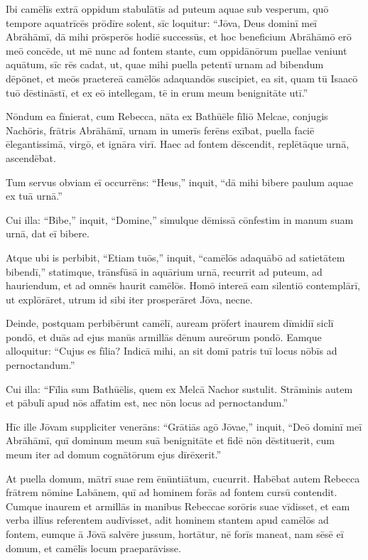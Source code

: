 \Versus Ibi camēlīs extrā oppidum stabulātīs ad puteum aquae sub vesperum, quō tempore aquatrīcēs prōdīre solent,
\Versus sīc loquitur: ``Jōva, Deus dominī meī Abrāhāmī, dā mihi prōsperōs hodiē successūs, et hoc beneficium Abrāhāmō erō meō concēde,
\Versus ut mē nunc ad fontem stante, cum oppidānōrum puellae veniunt aquātum, sīc rēs cadat,
\Versus ut, quae mihi puella petentī urnam ad bibendum dēpōnet, et meōs praetereā camēlōs adaquandōs suscipiet, ea sit, quam tū Isaacō tuō dēstināstī, et ex eō intellegam, tē in erum meum benignitāte utī.''

\Versus Nōndum ea fīnierat, cum Rebecca, nāta ex Bathūēle fīliō Melcae, conjugis Nachōris, frātris Abrāhāmī, urnam in umerīs ferēns exībat,
\Versus puella faciē ēlegantissimā, virgō, et ignāra virī. Haec ad fontem dēscendit, replētāque urnā, ascendēbat.

\Versus Tum servus obviam eī occurrēns: ``Heus,'' inquit, ``dā mihi bibere paulum aquae ex tuā urnā.''

\Versus Cui illa: ``Bibe,'' inquit, ``Domine,'' simulque dēmissā cōnfestim in manum suam urnā, dat eī bibere.

\Versus Atque ubi is perbibit, ``Etiam tuōs,'' inquit, ``camēlōs adaquābō ad satietātem bibendī,''
\Versus statimque, trānsfūsā in aquārium urnā, recurrit ad puteum, ad hauriendum, et ad omnēs haurit camēlōs.
\Versus Homō intereā eam silentiō contemplārī, ut explōrāret, utrum id sibi iter prosperāret Jōva, necne.

\Versus Deinde, postquam perbibērunt camēlī, auream prōfert inaurem dīmidiī siclī pondō, et duās ad ejus manūs armillās dēnum aureōrum pondō.
\Versus Eamque alloquitur: ``Cujus es fīlia? Indicā mihi, an sit domī patris tuī locus nōbīs ad pernoctandum.''

\Versus Cui illa: ``Fīlia sum Bathūēlis, quem ex Melcā Nachor sustulit.
\Versus Strāminis autem et pābulī apud nōs affatim est, nec nōn locus ad pernoctandum.''

\Versus Hīc ille Jōvam suppliciter venerāns: ``Grātiās agō Jōvae,''
\Versus inquit, ``Deō dominī meī Abrāhāmī, quī dominum meum suā benignitāte et fidē nōn dēstituerit, cum meum iter ad domum cognātōrum ejus dīrēxerit.''

\Versus At puella domum, mātrī suae rem ēnūntiātum, cucurrit.
\Versus Habēbat autem Rebecca frātrem nōmine Labānem, quī ad hominem forās ad fontem cursū contendit.
\Versus Cumque inaurem et armillās in manibus Rebeccae sorōris suae vīdisset, et eam verba illīus referentem audīvisset, adit hominem stantem apud camēlōs ad fontem,
\Versus eumque ā Jōvā salvēre jussum, hortātur, nē forīs maneat, nam sēsē eī domum, et camēlīs locum praeparāvisse.

